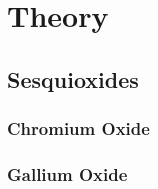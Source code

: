 \documentclass[12pt]{book}
\begin{document}
\chapter{Theory}
\section{Sesquioxides}

\subsection{Chromium Oxide}\label{Sec:Cr2O3}

\subsection{Gallium Oxide}


\newpage
\sloppy %
\printbibliography
\end{document}
